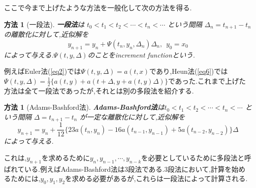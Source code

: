 \documentclass[a4paper,dvipdfmx]{jreport}
\numberwithin{equation}{section}
\newtheorem{Method}[Thm]{方法}
\renewenvironment{leftbar}{%
  \def\FrameCommand{\vrule width 1pt \hspace{10pt}}%
  \MakeFramed {\advance\hsize-\width \FrameRestore}}%
 {\endMakeFramed}
\def\method{\begin{leftbar}\begin{Method}}
\def\methodx{\end{Method}\end{leftbar}}
\def\eq{\begin{equation}}
\def\eqx{\end{equation}}
\newlength{\cellleftmargin}
\newlength{\smallerfontscale}
\def\smaller{\fontsize{\smallerfontscale}{\smallerfontscale}\selectfont}
\begin{document}
\par\vspace{1\smallerfontscale}%
    \begin{addmargin}[\cellleftmargin]{0em}%
    {\smaller%
    \vspace{-1\smallerfontscale}%
    
    \begin{center}
    \end{center}
    { \hspace*{\fill} \\}
    }%
    \end{addmargin}%
    \begin{addmargin}[\cellleftmargin]{0em}%
    {\smaller%
    \vspace{-1\smallerfontscale}%
    
    \begin{center}
    \end{center}
    { \hspace*{\fill} \\}
    }%
    \end{addmargin}%

ここで今まで上げたような方法を一般化して次の方法を得る.
\method[一段法]
{\bf 一段法}は $ t_0 < t_1 < t_2 < \cdots < t_n < \cdots $ という間隔 $\Delta_n = t_{n+1} - t_{n}$ の離散化に対して,近似解を
\eq
\label{eq7}
y_{n+1} = y_n + \Psi(t_n,y_n,\Delta_n) \Delta_n,\  \  y_0 = x_0
\eqx
によって与える.$\Psi(t,y,\Delta)$のことをincrement functionという.
\methodx
例えばEuler法(\ref{eq2})では$\Psi(t,y,\Delta) = a(t,x)$であり,Heun法(\ref{eq6})では
$\Psi(t,y,\Delta) = \frac{1}{2} \{ a(t,y) + a(t+\Delta ,y + a(t,y)\Delta) \}$であった.これまで上げた方法は全て一段法であったが,それとは別の多段法を紹介する.
\method[Adams-Bashford法]
{\bf Adams-Bashford法}は$ t_0 < t_1 < t_2 < \cdots < t_n < \cdots $ という間隔 $\Delta = t_{n+1} - t_{n}$ が一定な離散化に対して,近似解を
\eq
\label{eq8}
y_{n+1} = y_n + \frac{1}{12} \{ 23 a(t_n , y_n) - 16 a(t_{n-1},y_{n-1}) + 5 a(t_{n-2},y_{n-2}) \} \Delta
\eqx
によって与える.
\methodx
これは,$y_{n+1}$を求めるために$y_n , y_{n-1} , \cdots , y_{n-k} $を必要としているために多段法と呼ばれている.例えばAdams-Bashford法は3段法である.3段法において,計算を始めるためには,$y_0,y_1,y_2$を求める必要があるが,これらは一段法によって計算される.\par
\end{document}
